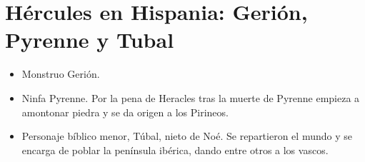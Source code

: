 \section{Hércules en Hispania: Gerión, Pyrenne y Tubal}
\begin{itemize}
    \item Monstruo Gerión.
    \item Ninfa Pyrenne. Por la pena de Heracles tras la muerte de Pyrenne empieza a amontonar piedra y se da origen a los Pirineos.
    \item Personaje bíblico menor, Túbal, nieto de Noé. Se repartieron el mundo y se encarga de poblar la península ibérica, dando entre otros a los vascos.
\end{itemize}